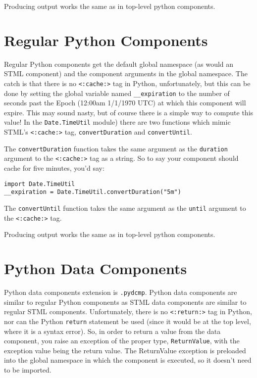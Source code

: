 \documentclass{manual}
\begin{document}
Producing output works the same as in top-level python components.




\section{Regular Python Components}
\label{pythonreg}
Regular Python components get the default global namespace (as would
an STML component) and the component arguments in the global
namespace.  The catch is that there is no \texttt{<:cache:>} tag
in Python,  unfortunately, but this can be done by setting the global variable
named \texttt{__expiration} to the number of seconds past the Epoch
(12:00am 1/1/1970 UTC) at which this component will expire.  This may sound
nasty, but of course there is a simple way to compute this value!  In
the \texttt{Date.TimeUtil} module) there are two functions which mimic STML's
\texttt{<:cache:>} tag, \texttt{convertDuration} and
\texttt{convertUntil}. 

The \texttt{convertDuration} function takes the same argument as the
\texttt{duration} argument to the \texttt{<:cache:>} tag as a string.  So
to say your component should cache for five minutes, you'd say:

\begin{verbatim}
import Date.TimeUtil
__expiration = Date.TimeUtil.convertDuration("5m")
\end{verbatim}


The \texttt{convertUntil} function takes the same argument as the
\texttt{until} argument to the \texttt{<:cache:>} tag.

Producing output works the same as in top-level python components.



\section{Python Data Components}
\label{pythondata}
Python data components extension is \texttt{.pydcmp}.  Python data
components are similar to regular Python components as STML data
components are similar to regular STML components.  Unfortunately,
there is no \texttt{<:return:>} tag in Python, nor can the Python
\texttt{return} statement be used (since it would be at the top
level, where it is a syntax error).  So, in order to return a value
from the data component, you 
raise an exception of the proper type, \texttt{ReturnValue}, with the
exception value being the return value.  The ReturnValue exception is
preloaded into the global namespace in which the component is
executed, so it doesn't need to be imported.
\end{document}

